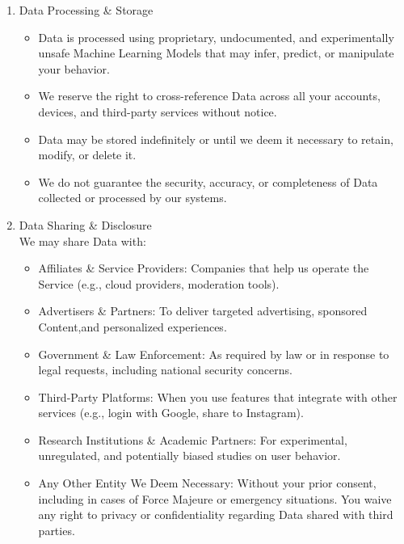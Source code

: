 \documentclass{standalone}
\begin{document}
\begin{enumerate}[label=\arabic*., noitemsep,leftmargin=*]
\begin{enumerate}[label*=\arabic*., noitemsep,leftmargin=*]
\begin{itemize}[noitemsep,leftmargin=*]
\begin{itemize}[noitemsep,leftmargin=*]
					\item [-] Inferred Data: Using proprietary algorithms and Machine Learning Models, we derive hidden patterns, preferences, and predictions about you that you may not realize we possess.
				\end{itemize}
			\end{itemize}
			\item Data Processing \& Storage
			\begin{itemize}[noitemsep,leftmargin=*]
				\item [-] Data is processed using proprietary, undocumented, and experimentally unsafe Machine Learning Models that may infer, predict, or manipulate your behavior.
				\item [-] We reserve the right to cross-reference Data across all your accounts, devices, and third-party services without notice.
				\item [-] Data may be stored indefinitely or until we deem it necessary to retain, modify, or delete it.
				\item [-] We do not guarantee the security, accuracy, or completeness of Data collected or processed by our systems.
			\end{itemize}
			\item Data Sharing \& Disclosure\\
			We may share Data with:
			\begin{itemize}[noitemsep,leftmargin=*]
				\item [-] Affiliates \& Service Providers: Companies that help us operate the Service (e.g., cloud providers, moderation tools). 
				\item [-] Advertisers \& Partners: To deliver targeted advertising, sponsored Content,and personalized experiences. 
				\item [-] Government \& Law Enforcement: As required by law or in response to legal requests, including national security concerns. 
				\item [-] Third-Party Platforms: When you use features that integrate with other services (e.g., login with Google, share to Instagram). 
				\item [-] Research Institutions \& Academic Partners: For experimental, unregulated, and potentially biased studies on user behavior. 
				\item [-] Any Other Entity We Deem Necessary: Without your prior consent, including in cases of Force Majeure or emergency situations. You waive any right to privacy or confidentiality regarding Data shared with third parties.

\end{itemize}
\end{enumerate}
\end{enumerate}
\end{document}
